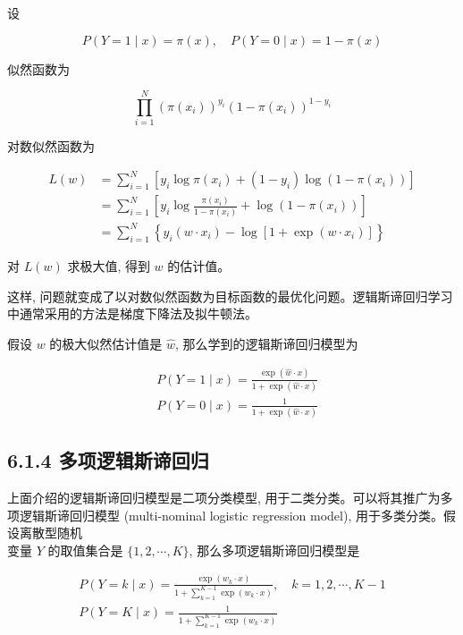 \documentclass[10pt]{article}
\begin{document}
\begin{CJK*}{UTF8}{bsmi}
设

$$
P(Y=1 \mid x)=\pi(x), \quad P(Y=0 \mid x)=1-\pi(x)
$$

似然函数为

$$
\prod_{i=1}^{N}\left(\pi\left(x_{i}\right)\right)^{y_{i}}\left(1-\pi\left(x_{i}\right)\right)^{1-y_{i}}
$$

对数似然函数为

$$
\begin{aligned}
L(w) & =\sum_{i=1}^{N}\left[y_{i} \log \pi\left(x_{i}\right)+\left(1-y_{i}\right) \log \left(1-\pi\left(x_{i}\right)\right)\right] \\
& =\sum_{i=1}^{N}\left[y_{i} \log \frac{\pi\left(x_{i}\right)}{1-\pi\left(x_{i}\right)}+\log \left(1-\pi\left(x_{i}\right)\right)\right] \\
& =\sum_{i=1}^{N}\left\{y_{i}\left(w \cdot x_{i}\right)-\log \left[1+\exp \left(w \cdot x_{i}\right)\right]\right\}
\end{aligned}
$$

对 $L(w)$ 求极大值, 得到 $w$ 的估计值。

这样, 问题就变成了以对数似然函数为目标函数的最优化问题。逻辑斯谛回归学习中通常采用的方法是梯度下降法及拟牛顿法。

假设 $w$ 的极大似然估计值是 $\hat{w}$, 那么学到的逻辑斯谛回归模型为

$$
\begin{aligned}
& P(Y=1 \mid x)=\frac{\exp (\hat{w} \cdot x)}{1+\exp (\hat{w} \cdot x)} \\
& P(Y=0 \mid x)=\frac{1}{1+\exp (\hat{w} \cdot x)}
\end{aligned}
$$

\subsection*{6.1.4 多项逻辑斯谛回归}
上面介绍的逻辑斯谛回归模型是二项分类模型, 用于二类分类。可以将其推广为多项逻辑斯谛回归模型 (multi-nominal logistic regression model), 用于多类分类。假设离散型随机\\
变量 $Y$ 的取值集合是 $\{1,2, \cdots, K\}$, 那么多项逻辑斯谛回归模型是


\begin{gather*}
P(Y=k \mid x)=\frac{\exp \left(w_{k} \cdot x\right)}{1+\sum_{k=1}^{K-1} \exp \left(w_{k} \cdot x\right)}, \quad k=1,2, \cdots, K-1  \tag{6.7}\\
P(Y=K \mid x)=\frac{1}{1+\sum_{k=1}^{K-1} \exp \left(w_{k} \cdot x\right)} \tag{6.8}
\end{gather*}



\end{CJK*}
\end{document}
